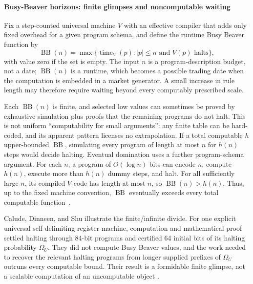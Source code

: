 \documentclass[aps,pra,reprint,superscriptaddress,amsmath,amssymb,floatfix]{revtex4-2}
\theoremstyle{plain}
\theoremstyle{definition}
\theoremstyle{remark}
\begin{document}
\paragraph{Busy-Beaver horizons: finite glimpses and noncomputable waiting}

Fix a step-counted universal machine \(V\) with an effective compiler that adds
only fixed overhead for a given program schema, and define the runtime Busy
Beaver function by
\begin{equation}
  \operatorname{BB}(n)
  =
  \max\{\operatorname{time}_V(p):
  |p|\leq n\text{ and }V(p)\text{ halts}\},
  \label{eq:busybeaver}
\end{equation}
with value zero if the set is empty. The input \(n\) is a program-description
budget, not a date; \(\operatorname{BB}(n)\) is a runtime, which becomes a
possible trading date when the computation is embedded in a market generator.
A small increase in rule length may therefore require waiting beyond every
computably prescribed scale.

Each \(\operatorname{BB}(n)\) is finite, and selected low values can sometimes
be proved by exhaustive simulation plus proofs that the remaining programs do
not halt. This is not uniform ``computability for small arguments'': any finite
table can be hard-coded, and its apparent pattern licenses no extrapolation. If
a total computable \(h\) upper-bounded \(\operatorname{BB}\), simulating every
program of length at most \(n\) for \(h(n)\) steps would decide halting.
Eventual domination uses a further program-schema argument. For each \(n\), a
program of \(O(\log n)\) bits can encode \(n\), compute \(h(n)\), execute more
than \(h(n)\) dummy steps, and halt. For all sufficiently large \(n\), its
compiled \(V\)-code has length at most \(n\), so
\(\operatorname{BB}(n)>h(n)\). Thus, up to the fixed machine convention,
\(\operatorname{BB}\) eventually exceeds every total computable
function~\cite{rado,chaitin-bb}.

Calude, Dinneen, and Shu illustrate the finite/infinite divide. For one explicit
universal self-delimiting register machine, computation and mathematical proof
settled halting through 84-bit programs and certified 64 initial bits of its
halting probability \(\Omega_U\). They did not compute Busy Beaver values, and
the work needed to recover the relevant halting programs from longer supplied
prefixes of \(\Omega_U\) outruns every computable bound. Their result is a
formidable finite glimpse, not a scalable computation of an uncomputable object
\cite{2002-glimpseofran}.
\end{document}

